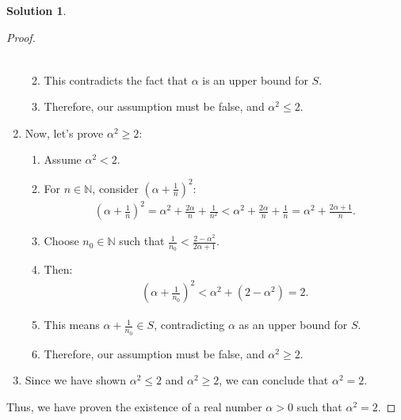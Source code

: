 \documentclass[12pt]{article}
\theoremstyle{definition} %
\newtheorem{solution}{Solution}
\theoremstyle{plain} %
\begin{document}
\begin{solution}
\begin{proof}
\begin{enumerate}
\begin{enumerate}
\begin{align}
                  \end{align}
                  \item This contradicts the fact that $\alpha$ is an upper bound for $S$.
                  \item Therefore, our assumption must be false, and $\alpha^2 \leq 2$.
              \end{enumerate}
              \item Now, let's prove $\alpha^2 \geq 2$:
              \begin{enumerate}
                  \item Assume $\alpha^2 < 2$.
                  \item For $n \in \mathbb{N}$, consider $(\alpha + \frac{1}{n})^2$:
                  \begin{align}
                  \left( \alpha + \frac{1}{n} \right)^2 = \alpha^2 + \frac{2\alpha}{n} + \frac{1}{n^2} < \alpha^2 + \frac{2\alpha}{n} + \frac{1}{n} = \alpha^2 + \frac{2\alpha + 1}{n}.
                  \end{align}
                  \item Choose $n_0 \in \mathbb{N}$ such that $\frac{1}{n_0} < \frac{2 - \alpha^2}{2\alpha + 1}$.
                  \item Then:
                  \begin{align}
                  \left( \alpha + \frac{1}{n_0} \right)^2 < \alpha^2 + (2 - \alpha^2) = 2.
                  \end{align}
                  \item This means $\alpha + \frac{1}{n_0} \in S$, contradicting $\alpha$ as an upper bound for $S$.
                  \item Therefore, our assumption must be false, and $\alpha^2 \geq 2$.
              \end{enumerate}
              \item Since we have shown $\alpha^2 \leq 2$ and $\alpha^2 \geq 2$, we can conclude that $\alpha^2 = 2$.
          \end{enumerate}
          
          Thus, we have proven the existence of a real number $\alpha > 0$ such that $\alpha^2 = 2$. 
          
      \end{proof}
  \end{solution}
\end{document}
